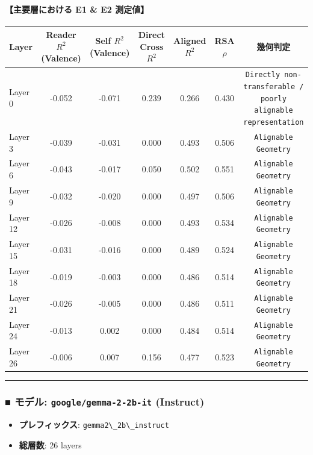 \paragraph{【主要層における E1 \& E2 測定値】}
\begin{center}
\small
\begin{tabular}{lcccccc}
\toprule
\textbf{Layer} & \textbf{Reader $R^2$ (Valence)} & \textbf{Self $R^2$ (Valence)} & \textbf{Direct Cross $R^2$} & \textbf{Aligned $R^2$} & \textbf{RSA $\rho$} & \textbf{幾何判定} \\
\midrule
Layer  0 & -0.052 & -0.071 & 0.239 & 0.266 & 0.430 & \texttt{Directly non-transferable / poorly alignable representation} \\
Layer  3 & -0.039 & -0.031 & 0.000 & 0.493 & 0.506 & \texttt{Alignable Geometry} \\
Layer  6 & -0.043 & -0.017 & 0.050 & 0.502 & 0.551 & \texttt{Alignable Geometry} \\
Layer  9 & -0.032 & -0.020 & 0.000 & 0.497 & 0.506 & \texttt{Alignable Geometry} \\
Layer 12 & -0.026 & -0.008 & 0.000 & 0.493 & 0.534 & \texttt{Alignable Geometry} \\
Layer 15 & -0.031 & -0.016 & 0.000 & 0.489 & 0.524 & \texttt{Alignable Geometry} \\
Layer 18 & -0.019 & -0.003 & 0.000 & 0.486 & 0.514 & \texttt{Alignable Geometry} \\
Layer 21 & -0.026 & -0.005 & 0.000 & 0.486 & 0.511 & \texttt{Alignable Geometry} \\
Layer 24 & -0.013 & 0.002 & 0.000 & 0.484 & 0.514 & \texttt{Alignable Geometry} \\
Layer 26 & -0.006 & 0.007 & 0.156 & 0.477 & 0.523 & \texttt{Alignable Geometry} \\
\bottomrule
\end{tabular}
\end{center}



\vspace{0.5em}\hrule\vspace{0.5em}

\subsubsection{■ モデル: \texttt{google/gemma-2-2b-it} (Instruct)}
\begin{itemize}
\item \textbf{プレフィックス}: \texttt{gemma2\textbackslash{}\_2b\textbackslash{}\_instruct}
\item \textbf{総層数}: 26 layers
\end{itemize}

